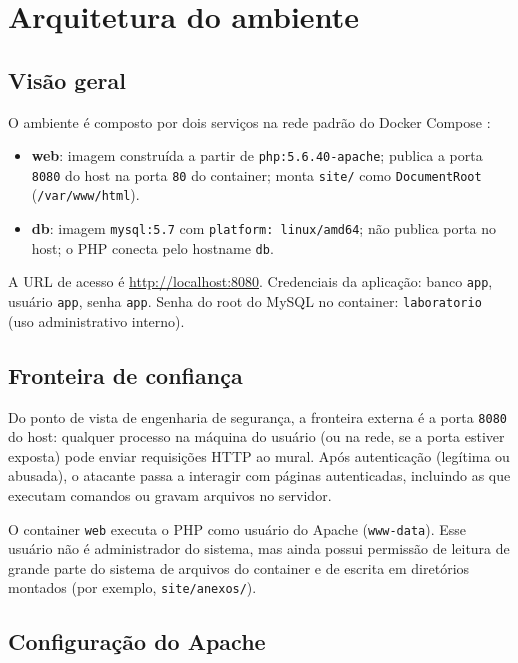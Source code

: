   \section{Arquitetura do ambiente}
  
  \subsection{Visão geral}
  
  O ambiente é composto por dois serviços na rede padrão do Docker Compose \cite{dockerCompose}:
  
  \begin{itemize}
      \item \textbf{web}: imagem construída a partir de \texttt{php:5.6.40-apache}; publica a porta
            \texttt{8080} do host na porta \texttt{80} do container; monta \texttt{site/} como
            \texttt{DocumentRoot} (\texttt{/var/www/html}).
      \item \textbf{db}: imagem \texttt{mysql:5.7} com \texttt{platform: linux/amd64}; não publica
            porta no host; o PHP conecta pelo hostname \texttt{db}.
  \end{itemize}
  
  A URL de acesso é \url{http://localhost:8080}. Credenciais da aplicação: banco \texttt{app},
  usuário \texttt{app}, senha \texttt{app}. Senha do root do MySQL no container: \texttt{laboratorio}
  (uso administrativo interno).
  
  \subsection{Fronteira de confiança}
  
  Do ponto de vista de engenharia de segurança, a fronteira externa é a porta \texttt{8080} do host:
  qualquer processo na máquina do usuário (ou na rede, se a porta estiver exposta) pode enviar
  requisições HTTP ao mural. Após autenticação (legítima ou abusada), o atacante passa a interagir
  com páginas autenticadas, incluindo as que executam comandos ou gravam arquivos no servidor.
  
  O container \texttt{web} executa o PHP como usuário do Apache (\texttt{www-data}). Esse usuário
  não é administrador do sistema, mas ainda possui permissão de leitura de grande parte do sistema
  de arquivos do container e de escrita em diretórios montados (por exemplo, \texttt{site/anexos/}).
  
  \subsection{Configuração do Apache}
  
